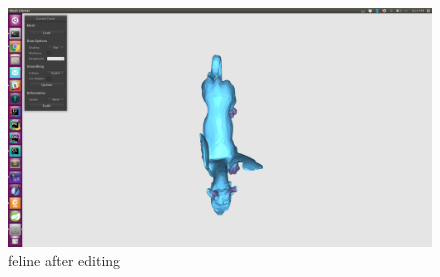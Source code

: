 \documentclass[twocolumn, a4paper]{article}
\begin{document}
\begin{figure}[H]
	\centering
	\includegraphics[width=1.0\linewidth]{feline_after3.png}
	\caption{feline after editing}
\end{figure}
\end{document}
